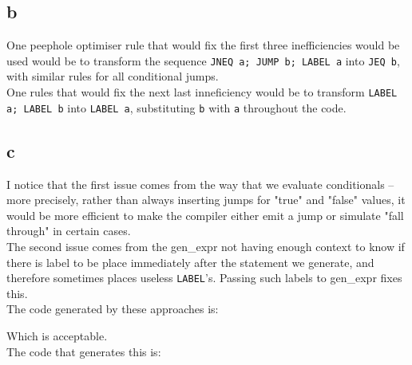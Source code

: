 \subsection{b}
One peephole optimiser rule that would fix the first three inefficiencies would be used would be to transform the sequence \texttt{JNEQ a; JUMP b; LABEL a} into \texttt{JEQ b}, with similar rules for all conditional jumps.\\
One rules that would fix the next last inneficiency would be to transform \texttt{LABEL a; LABEL b} into \texttt{LABEL a}, substituting \texttt{b} with \texttt{a} throughout the code.

\subsection{c}

I notice that the first issue comes from the way that we evaluate conditionals -- more precisely, rather than always inserting jumps for "true" and "false" values, it would be more efficient to make the compiler either emit a jump or simulate "fall through" in certain cases. \\
The second issue comes from the gen\_expr not having enough context to know if there is label to be place immediately after the statement we generate, and therefore sometimes places useless \texttt{LABEL}'s. Passing such labels to gen\_expr fixes this. \\
The code generated by these approaches is:

Which is acceptable. \\

The code that generates this is:

